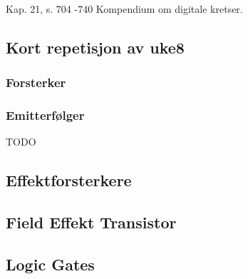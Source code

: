 Kap. 21, s. 704 -740
Kompendium om digitale kretser.

\subsection{Kort repetisjon av uke8}
  \subsubsection{Forsterker}
    
  \subsubsection{Emitterfølger}
    TODO

\subsection{Effektforsterkere}
  

\subsection{Field Effekt Transistor}
  

\subsection{Logic Gates}
  

